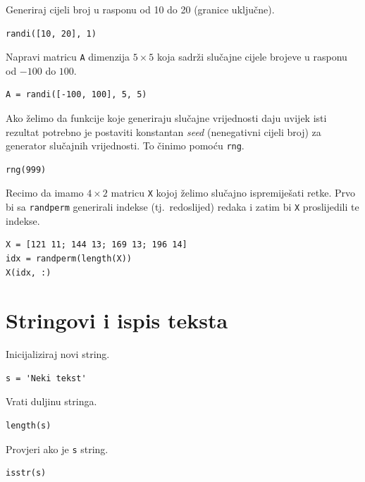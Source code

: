 \documentclass[a4paper, 10pt]{article}
\newcommand{\spec}[1]{\texttt{#1}} %
\newcommand{\eng}[1]{\emph{#1}} %
\begin{document}
Generiraj cijeli broj u rasponu od 10 do 20 (granice uključne).

\begin{lstlisting}
randi([10, 20], 1)
\end{lstlisting}

Napravi matricu \spec{A} dimenzija $5 \times 5$ koja sadrži slučajne cijele brojeve u rasponu od $-100$ do $100$.

\begin{lstlisting}
A = randi([-100, 100], 5, 5)
\end{lstlisting}

Ako želimo da funkcije koje generiraju slučajne vrijednosti daju uvijek isti rezultat potrebno je postaviti konstantan \eng{seed} (nenegativni cijeli broj) za generator slučajnih vrijednosti.
To činimo pomoću \spec{rng}.

\begin{lstlisting}
rng(999)
\end{lstlisting}

Recimo da imamo $4 \times 2$ matricu \spec{X} kojoj želimo slučajno ispremiješati retke.
Prvo bi sa \spec{randperm} generirali indekse (tj.\ redoslijed) redaka i zatim bi \spec{X} proslijedili te indekse.

\begin{lstlisting}
X = [121 11; 144 13; 169 13; 196 14]
idx = randperm(length(X))
X(idx, :)
\end{lstlisting}


\section{Stringovi i ispis teksta}

Inicijaliziraj novi string.

\begin{lstlisting}
s = 'Neki tekst'
\end{lstlisting}

Vrati duljinu stringa.

\begin{lstlisting}
length(s)
\end{lstlisting}

Provjeri ako je \spec{s} string.

\begin{lstlisting}
isstr(s)
\end{lstlisting}
\end{document}
